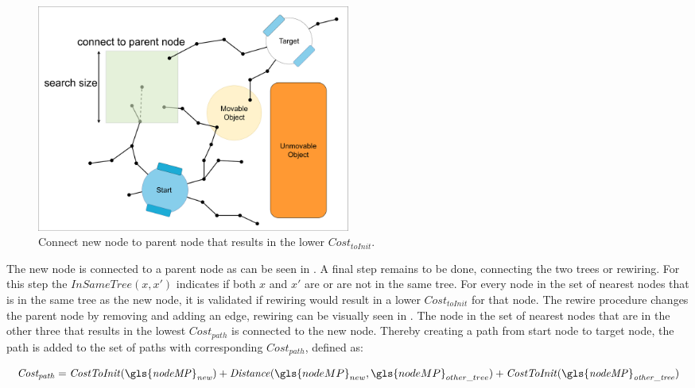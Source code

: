 \begin{figure}[H]
    \centering
    \includegraphics[width=0.5\textwidth, cfbox=my_yellow 5pt 0pt]{figures/required_background/mp/4mp_connect_to_tree.drawio.png}
    \caption{Connect new node to parent node that results in the lower $\mathit{Cost_{toInit}}$.}%
    \label{fig:motion_planner_adding_one_node_two}
\end{figure}

The new node is connected to a parent node as can be seen in . A final step remains to be done, connecting the two trees or rewiring. For this step the $\mathit{InSameTree}(x, x')$ indicates if both $x$ and $x'$ are or are not in the same tree. For every node in the set of nearest nodes that is in the same tree as the new node, it is validated if rewiring would result in a lower $\mathit{Cost_{toInit}}$ for that node. The rewire procedure changes the parent node by removing and adding an edge, rewiring can be visually seen in . The node in the set of nearest nodes that are in the other three that results in the lowest $\mathit{Cost_{path}}$ is connected to the new node. Thereby creating a path from start node to target node, the path is added to the set of paths with corresponding $\mathit{Cost}_\mathit{path}$, defined as:\bs

\[\mathit{Cost_{path}} = \mathit{CostToInit(\gls{nodeMP}_{new})} + \mathit{Distance}(\gls{nodeMP}_{new}, \gls{nodeMP}_{other\_tree}) +\mathit{CostToInit(\gls{nodeMP}_{other\_tree})} \]


